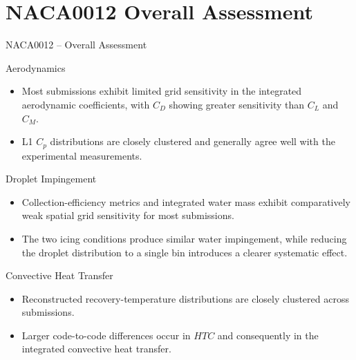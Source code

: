 
\section[Assessment]{\textbf{NACA0012 Overall Assessment}}



\begin{frame}[shrink]{\small NACA0012 -- Overall Assessment}
\scriptsize

\begin{block}{\scriptsize Aerodynamics}
\begin{itemize}
    \item Most submissions exhibit limited grid sensitivity in the integrated aerodynamic coefficients, with $C_D$ showing greater sensitivity than $C_L$ and $C_M$.
    \item L1 $C_p$ distributions are closely clustered and generally agree well with the experimental measurements.
\end{itemize}
\end{block}

\vspace{0.15cm}

\begin{block}{\scriptsize Droplet Impingement}
\begin{itemize}
    \item Collection-efficiency metrics and integrated water mass exhibit comparatively weak spatial grid sensitivity for most submissions.
    \item The two icing conditions produce similar water impingement, while reducing the droplet distribution to a single bin introduces a clearer systematic effect.
\end{itemize}
\end{block}

\vspace{0.15cm}

\begin{block}{\scriptsize Convective Heat Transfer}
\begin{itemize}
    \item Reconstructed recovery-temperature distributions are closely clustered across submissions.
    \item Larger code-to-code differences occur in $HTC$ and consequently in the integrated convective heat transfer.
\end{itemize}
\end{block}


\end{frame}
